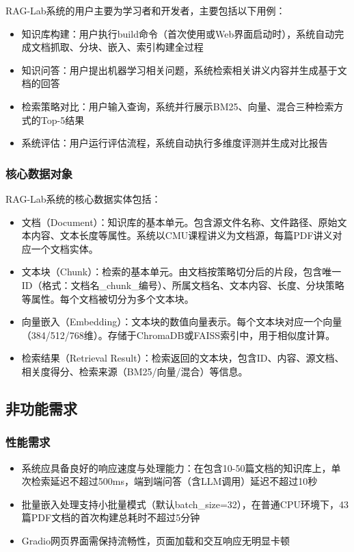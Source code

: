 \documentclass[10pt,a4paper]{article}
\begin{document}
RAG-Lab系统的用户主要为学习者和开发者，主要包括以下用例：
\begin{itemize}
\item 知识库构建：用户执行build命令（首次使用或Web界面启动时），系统自动完成文档抓取、分块、嵌入、索引构建全过程
\item 知识问答：用户提出机器学习相关问题，系统检索相关讲义内容并生成基于文档的回答
\item 检索策略对比：用户输入查询，系统并行展示BM25、向量、混合三种检索方式的Top-5结果
\item 系统评估：用户运行评估流程，系统自动执行多维度评测并生成对比报告
\end{itemize}

\subsubsection{核心数据对象}

RAG-Lab系统的核心数据实体包括：
\begin{itemize}
\item 文档（Document）：知识库的基本单元。包含源文件名称、文件路径、原始文本内容、文本长度等属性。系统以CMU课程讲义为文档源，每篇PDF讲义对应一个文档实体。
\item 文本块（Chunk）：检索的基本单元。由文档按策略切分后的片段，包含唯一ID（格式：文档名\_chunk\_编号）、所属文档名、文本内容、长度、分块策略等属性。每个文档被切分为多个文本块。
\item 向量嵌入（Embedding）：文本块的数值向量表示。每个文本块对应一个向量（384/512/768维）。存储于ChromaDB或FAISS索引中，用于相似度计算。
\item 检索结果（Retrieval Result）：检索返回的文本块，包含ID、内容、源文档、相关度得分、检索来源（BM25/向量/混合）等信息。
\end{itemize}

\subsection{非功能需求}

\subsubsection{性能需求}
\begin{itemize}
\item 系统应具备良好的响应速度与处理能力：在包含10-50篇文档的知识库上，单次检索延迟不超过500ms，端到端问答（含LLM调用）延迟不超过10秒
\item 批量嵌入处理支持小批量模式（默认batch\_size=32），在普通CPU环境下，43篇PDF文档的首次构建总耗时不超过5分钟
\item Gradio网页界面需保持流畅性，页面加载和交互响应无明显卡顿
\end{itemize}
\end{document}

